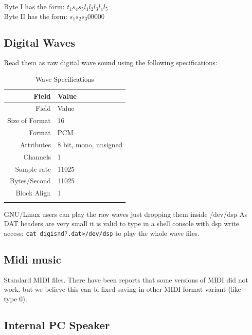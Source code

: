 \documentclass{article}
\begin{document}
 Byte I  has the form: $t_1 s_4 s_5 l_1 l_2 l_3 l_4 l_5$ \\
 Byte II has the form: $s_1 s_2 s_3  0  0  0  0  0$ \\

\subsection{Digital Waves}
 Read them as raw digital wave sound using the following specifications:

\renewcommand{\tabcolsep}{0.5em}
\begin{longtable}{rl}
  \hline
  Field&Value\\
  \hline
 \endfirsthead
  \hline
  Field&Value\\
  \hline
 \endhead
  Size of Format& 16 \\
  Format&         PCM \\
  Attributes&     8 bit, mono, unsigned \\
  Channels&       1 \\
  Sample rate&    11025 \\
  Bytes/Second&   11025 \\
  Block Align&    1 \\
\hline
\caption{Wave Specifications}
\label{wave specs}
\end{longtable}

 GNU/Linux users can play the raw waves just dropping them inside /dev/dsp
 As DAT headers are very small it is valid to type in a shell console with
 dsp write access: \verb!cat digisnd?.dat>/dev/dsp! to play the whole wave files.

\subsection{Midi music}
 Standard MIDI files. There have been reports that some versions of MIDI
 did not work, but we believe this can bi fixed saving in other MIDI
 format variant (like type 0).

\subsection{Internal PC Speaker}

\end{document}
